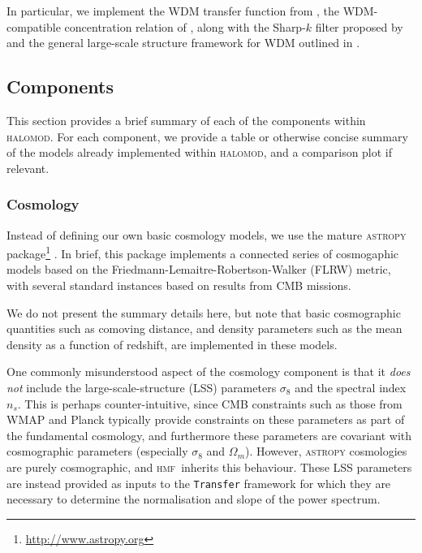 \documentclass[5p,aas_macros]{elsarticle}
\newcommand{\hmf}{\textsc{hmf}\xspace} %
\newcommand{\ztc}[1]{\textcolor{cyan}{\textbf{[ZTC: #1]}}}
\begin{document}
In particular, we implement the WDM transfer function from \cite{Viel2005}, the WDM-compatible concentration relation of \cite{Ludlow2016}, along with the Sharp-$k$ filter proposed by \cite{Schneider2012} and the general large-scale structure framework for WDM outlined in \cite{Smith2011a}.

\subsection{Components}
\label{sec:halomod:components}
This section provides a brief summary of each of the components within \textsc{halomod}. 
For each component, we provide a table or otherwise concise summary of the models already implemented within \textsc{halomod}, and a comparison plot if relevant. 


\subsubsection{Cosmology}
\label{sec:halomod:components:cosmology}
Instead of defining our own basic cosmology models, we use the mature \textsc{astropy} package\footnote{\url{http://www.astropy.org}} \citep{Robitaille2013}. In brief, this package implements a connected series of cosmogaphic models based on the Friedmann-Lemaitre-Robertson-Walker (FLRW) metric, with several standard instances based on results from CMB missions. 

We do not present the summary details here, but note that basic cosmographic quantities such as comoving distance, and density parameters such as the mean density as a function of redshift, are implemented in these models. 

One commonly misunderstood aspect of the cosmology component is that it \textit{does not} include the large-scale-structure (LSS) parameters $\sigma_8$ and the spectral index $n_s$. This is perhaps counter-intuitive, since CMB constraints such as those from WMAP and Planck typically provide constraints on these parameters as part of the fundamental cosmology, and furthermore these parameters are covariant with cosmographic parameters (especially $\sigma_8$ and $\Omega_m$). However, \textsc{astropy} cosmologies are purely cosmographic, and \hmf\ inherits this behaviour. These LSS parameters are instead provided as inputs to the \texttt{Transfer} framework for which they are necessary to determine the normalisation and slope of the power spectrum.
\end{document}
